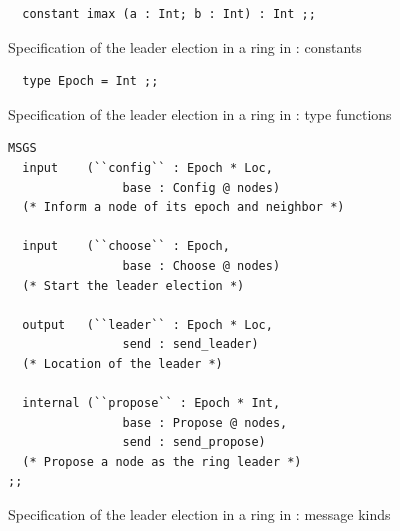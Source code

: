 \documentclass[final]{article}
\begin{document}
\begin{figure}[!t]
  \begin{center}
\begin{lstlisting}
  constant imax (a : Int; b : Int) : Int ;;
\end{lstlisting}
  \end{center}
  \caption{Specification of the leader election in a ring in \eml: constants}
  \label{fig:LR_constants}
\end{figure}

\begin{figure}[!t]
  \begin{center}
\begin{lstlisting}
  type Epoch = Int ;;
\end{lstlisting}
  \end{center}
  \caption{Specification of the leader election in a ring in \eml: type functions}
  \label{fig:LR_typefunctions}
\end{figure}

\begin{figure}[!t]
  \begin{center}
\begin{lstlisting}
MSGS
  input    (``config`` : Epoch * Loc,
                base : Config @ nodes)
  (* Inform a node of its epoch and neighbor *)

  input    (``choose`` : Epoch,
                base : Choose @ nodes)
  (* Start the leader election *)

  output   (``leader`` : Epoch * Loc,
      	       	send : send_leader)
  (* Location of the leader *)

  internal (``propose`` : Epoch * Int,
                base : Propose @ nodes,
      	       	send : send_propose)
  (* Propose a node as the ring leader *)
;;
\end{lstlisting}
  \end{center}
  \caption{Specification of the leader election in a ring in \eml: message kinds}
  \label{fig:LR_messages}
\end{figure}
\end{document}
